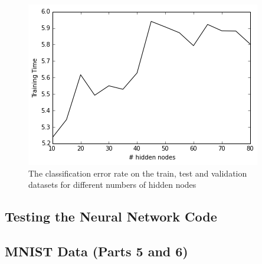 \documentclass[10pt]{article}
\begin{document}
\begin{figure}
\centering
\includegraphics[scale=0.5]{SGD_toy_data_2_training_time.png}
\caption{The classification error rate on the train, test and validation datasets for different numbers of hidden nodes}
\label{SGD_toy_data_2_training_time}
\end{figure}

\subsection*{Testing the Neural Network Code}

\subsection*{MNIST Data (Parts 5 and 6)}
\end{document}
